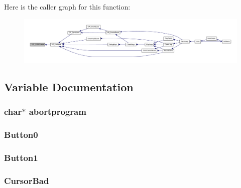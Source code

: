 Here is the caller graph for this function:
\nopagebreak
\begin{figure}[H]
\begin{center}
\leavevmode
\includegraphics[width=400pt]{ID__US__1_8C_a1b801715334a6be3455ebe13aab975ff_icgraph}
\end{center}
\end{figure}




\subsection{Variable Documentation}
\hypertarget{ID__US__1_8C_a4af009c4eb68eb1aaa0a93c8bffb3512}{
\subsubsection[{abortprogram}]{\setlength{\rightskip}{0pt plus 5cm}char$\ast$ {\bf abortprogram}}}
\label{ID__US__1_8C_a4af009c4eb68eb1aaa0a93c8bffb3512}
\hypertarget{ID__US__1_8C_a7fa08780907017f971b2dc0909bd77fd}{
\subsubsection[{Button0}]{ {\bf Button0}}}
\label{ID__US__1_8C_a7fa08780907017f971b2dc0909bd77fd}
\hypertarget{ID__US__1_8C_aca6b2fe999220340d0569ece03a0026d}{
\subsubsection[{Button1}]{ {\bf Button1}}}
\label{ID__US__1_8C_aca6b2fe999220340d0569ece03a0026d}
\hypertarget{ID__US__1_8C_abf5358251c5b519d71e3d8bca8256510}{
\subsubsection[{CursorBad}]{ {\bf CursorBad}}}
